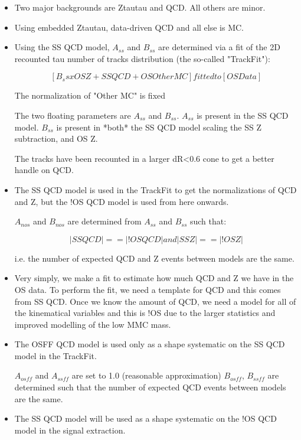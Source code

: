 \documentclass{article}
\begin{document}
\begin{itemize}

\item Two major backgrounds are Ztautau and QCD. All others are minor.

\item Using embedded Ztautau, data-driven QCD and all else is MC.

\item Using the SS QCD model, $A_{ss}$ and $B_{ss}$ are determined via a fit of the
2D recounted tau number of tracks distribution (the so-called "TrackFit"):

\[
[B_ss x OS Z + SS QCD + OS Other MC] fitted to [OS Data]
\]

The normalization of "Other MC" is fixed

The two floating parameters are $A_{ss}$ and $B_{ss}$.
$A_{ss}$ is present in the SS QCD model.
$B_{ss}$ is present in *both* the SS QCD model scaling the SS Z subtraction, and OS Z.

The tracks have been recounted in a larger dR<0.6 cone to get a better handle on QCD.

\item The SS QCD model is used in the TrackFit to get the normalizations of QCD
and Z, but the !OS QCD model is used from here onwards.

$A_{nos}$ and $B_{nos}$ are determined from $A_{ss}$ and $B_{ss}$ such that:

\[
|SS QCD| == |!OS QCD| and |SS Z| == |!OS Z|
\]

i.e. the number of expected QCD and Z events between models are the same.

\item  Very simply, we make a fit to estimate how much QCD and Z we have in the OS data.
To perform the fit, we need a template for QCD and this comes from SS QCD.
Once we know the amount of QCD, we need a model for all of the kinematical variables
and this is !OS due to the larger statistics and improved modelling of the
low MMC mass.

\item The OSFF QCD model is used only as a shape systematic on the SS QCD model in
the TrackFit.

$A_{osff}$ and $A_{ssff}$ are set to 1.0 (reasonable approximation)
$B_{osff}$, $B_{ssff}$ are determined such that the number of expected QCD
events between models are the same.

\item The SS QCD model will be used as a shape systematic on the !OS QCD model in
the signal extraction.


\end{itemize}
\end{document}
